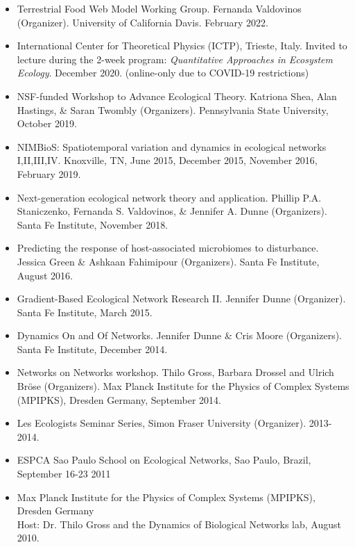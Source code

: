 \documentclass[margin,line,12pt]{res}
\begin{document}
\begin{resume}
\begin{itemize}
\item Terrestrial Food Web Model Working Group. Fernanda Valdovinos (Organizer). University of California Davis. February 2022.
  
\item International Center for Theoretical Physics (ICTP), Trieste, Italy. Invited to lecture during the 2-week program: \emph{Quantitative Approaches in Ecosystem Ecology}. December 2020. (online-only due to COVID-19 restrictions)

\item NSF-funded Workshop to Advance Ecological Theory. Katriona Shea, Alan Hastings, \& Saran Twombly (Organizers). Pennsylvania State University, October 2019.

\item NIMBioS: Spatiotemporal variation and dynamics in ecological networks I,II,III,IV. Knoxville, TN, June 2015, December 2015, November 2016, February 2019.  

\item Next-generation ecological network theory and application. Phillip P.A. Staniczenko, Fernanda S. Valdovinos, \& Jennifer A. Dunne (Organizers). Santa Fe Institute, November 2018.

\item Predicting the response of host-associated microbiomes to disturbance. Jessica Green \& Ashkaan Fahimipour (Organizers). Santa Fe Institute, August 2016.

\item Gradient-Based Ecological Network Research II. Jennifer Dunne (Organizer). Santa Fe Institute, March 2015.

\item Dynamics On and Of Networks. Jennifer Dunne \& Cris Moore (Organizers). Santa Fe Institute, December 2014.

\item Networks on Networks workshop. Thilo Gross, Barbara Drossel and Ulrich Br\"ose (Organizers). Max Planck Institute for the Physics of Complex Systems (MPIPKS), Dresden Germany, September 2014.

\item Les Ecologists Seminar Series, Simon Fraser University (Organizer). 2013-2014.

\item ESPCA Sao Paulo School on Ecological Networks, Sao Paulo, Brazil, September 16-23 2011

\item Max Planck Institute for the Physics of Complex Systems (MPIPKS), Dresden Germany\\
	Host: Dr. Thilo Gross and the Dynamics of Biological Networks lab, August 2010.


\end{itemize}
\end{resume}
\end{document}
